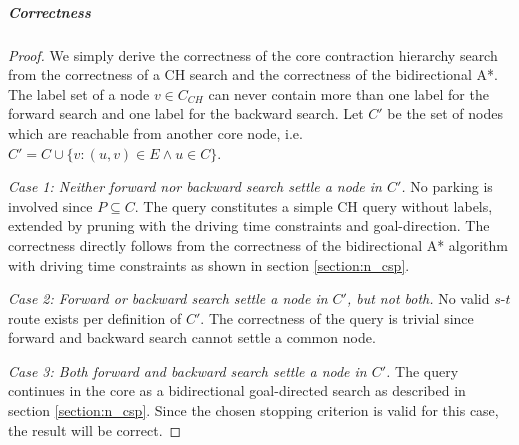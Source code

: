 \subparagraph{Correctness}
\begin{proof}
	We simply derive the correctness of the core contraction hierarchy search from the correctness of a CH search and the correctness of the bidirectional A*. The label set of a node $v \in C_{CH}$ can never contain more than one label for the forward search and one label for the backward search. Let $C'$ be the set of nodes which are reachable from another core node, i.e. $C' = C \cup \{v \colon (u,v) \in E \wedge u \in C\}$.

	\emph{Case 1: Neither forward nor backward search settle a node in $C'$.} No parking is involved since $P \subseteq C$. The query constitutes a simple CH query without labels, extended by pruning with the driving time constraints and goal-direction. The correctness directly follows from the correctness of the bidirectional A* algorithm with driving time constraints as shown in section \ref{section:n_csp}.

	\emph{Case 2: Forward or backward search settle a node in $C'$, but not both.} No valid $s$-$t$ route exists per definition of $C'$. The correctness of the query is trivial since forward and backward search cannot settle a common node.

	\emph{Case 3: Both forward and backward search settle a node in $C'$.} The query continues in the core as a bidirectional goal-directed search as described in section \ref{section:n_csp}. Since the chosen stopping criterion is valid for this case, the result will be correct.
\end{proof}
